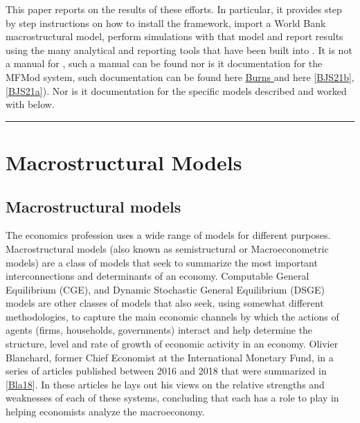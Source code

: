 \documentclass[letterpaper,10pt,english]{jupyterBook}
\begin{document}
\sphinxAtStartPar
This paper reports on the results of these efforts. In particular, it provides step by step instructions on how to install the  framework, import a World Bank macrostructural model,  perform simulations with that model and report results using the many analytical and reporting tools that have been built into .  It is not a manual for , such a manual can be found  nor is it documentation for the MFMod system, such documentation can be found here \hyperlink{cite.content/litterature:id15}{Burns } and here {[}\hyperlink{cite.content/litterature:id18}{BJS21b}{]}, {[}\hyperlink{cite.content/litterature:id14}{BJS21a}{]}). Nor is it documentation for the specific models described and worked with below.


\bigskip\hrule\bigskip


\sphinxstepscope


\part{Macrostructural Models}

\sphinxstepscope


\chapter{Macrostructural models}
\label{\detokenize{content/02_MacrostructuralModels/MacroStructuralModels:macrostructural-models}}\label{\detokenize{content/02_MacrostructuralModels/MacroStructuralModels::doc}}
\sphinxAtStartPar
The economics profession uses a wide range of models for different purposes.  Macro\sphinxhyphen{}structural models (also known as semi\sphinxhyphen{}structural or Macro\sphinxhyphen{}econometric models) are a class of models that seek to summarize the most important interconnections and determinants of an economy. Computable General Equilibrium (CGE), and Dynamic Stochastic General Equilibrium (DSGE) models are other classes of models that also seek, using somewhat different methodologies, to capture the main economic channels by which the actions of agents (firms, households, governments) interact and help determine the structure, level and rate of growth of economic activity in an economy. Olivier Blanchard, former Chief Economist at the International Monetary Fund, in a series of articles published between 2016 and 2018 that were summarized in {[}\hyperlink{cite.content/litterature:id17}{Bla18}{]}. In these articles he lays out his views on the relative strengths and weaknesses of each of these systems, concluding that each has a role to play in helping economists analyze the macro\sphinxhyphen{}economy.
\end{document}
